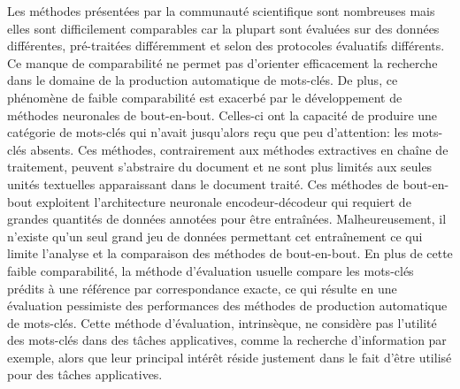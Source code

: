 Les méthodes présentées par la communauté scientifique sont nombreuses mais elles sont difficilement comparables car la plupart sont évaluées sur des données différentes, pré-traitées différemment et selon des protocoles évaluatifs différents.
Ce manque de comparabilité ne permet pas d'orienter efficacement la recherche dans le domaine de la production automatique de mots-clés.
%
De plus, ce phénomène de faible comparabilité est exacerbé par le développement de méthodes neuronales de bout-en-bout. Celles-ci ont la capacité de produire une catégorie de mots-clés qui n'avait jusqu'alors reçu que peu d'attention: les mots-clés absents. Ces méthodes, contrairement aux méthodes extractives en chaîne de traitement, peuvent s'abstraire du document et ne sont plus limités aux seules unités textuelles apparaissant dans le document traité.
%
Ces méthodes de bout-en-bout exploitent l'architecture neuronale encodeur-décodeur qui requiert de grandes quantités de données annotées pour être entraînées.
Malheureusement, il n'existe qu'un seul grand jeu de données permettant cet entraînement ce qui limite l'analyse et la comparaison des méthodes de bout-en-bout.
%
En plus de cette faible comparabilité, la méthode d'évaluation usuelle compare les mots-clés prédits à une référence par correspondance exacte, ce qui résulte en une évaluation pessimiste des performances des méthodes de production automatique de mots-clés.
Cette méthode d'évaluation, intrinsèque, ne considère pas l'utilité des mots-clés dans des tâches applicatives, comme la recherche d'information par exemple, alors que leur principal intérêt réside justement dans le fait d'être utilisé pour des tâches applicatives.

